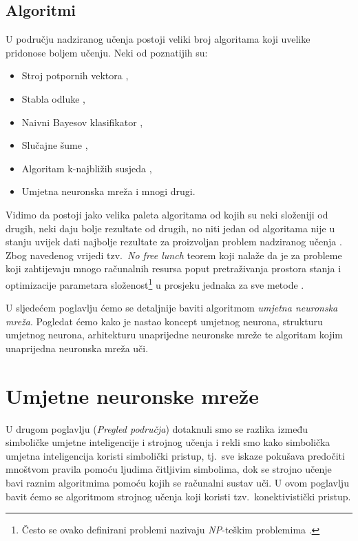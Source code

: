 \documentclass[times, utf8, zavrsni]{fer}
\begin{document}
\bigskip

\section{Algoritmi}
U području nadziranog učenja postoji veliki broj algoritama koji uvelike pridonose boljem učenju. Neki od poznatijih su:

\begin{itemize}
    \item Stroj potpornih vektora ,
    \item Stabla odluke ,
    \item Naivni Bayesov klasifikator ,
    \item Slučajne šume ,
    \item Algoritam k-najbližih susjeda ,
    \item Umjetna neuronska mreža  i mnogi drugi.
\end{itemize}

\bigskip

Vidimo da postoji jako velika paleta algoritama od kojih su neki složeniji od drugih, neki daju bolje rezultate od drugih, no niti jedan od algoritama
nije u stanju uvijek dati najbolje rezultate za proizvoljan problem nadziranog učenja \citep{wiki:SUP}. Zbog navedenog vrijedi tzv.\ \textit{No free lunch} teorem koji nalaže da je za probleme koji zahtijevaju mnogo računalnih resursa poput pretraživanja prostora stanja i optimizacije parametara složenost\footnote{Često se ovako definirani problemi nazivaju \textit{NP}-teškim problemima .} u prosjeku jednaka za sve metode \citep{wiki:NFL}.

\bigskip
\bigskip

U sljedećem poglavlju ćemo se detaljnije baviti algoritmom \textit{umjetna neuronska mreža}. Pogledat ćemo kako je nastao koncept umjetnog neurona, strukturu umjetnog neurona, arhitekturu unaprijedne neuronske mreže te algoritam kojim unaprijedna neuronska mreža uči.

\chapter{Umjetne neuronske mreže}
U drugom poglavlju (\textit{Pregled područja}) dotaknuli smo se razlika između simboličke umjetne inteligencije i strojnog učenja i rekli smo kako simbolička umjetna inteligencija koristi simbolički pristup, tj.\ sve iskaze pokušava predočiti mnoštvom pravila pomoću ljudima čitljivim simbolima, dok se strojno učenje bavi raznim algoritmima pomoću kojih se računalni sustav uči. U ovom poglavlju bavit ćemo se algoritmom strojnog učenja koji koristi tzv.\ konektivistički pristup.
\end{document}
